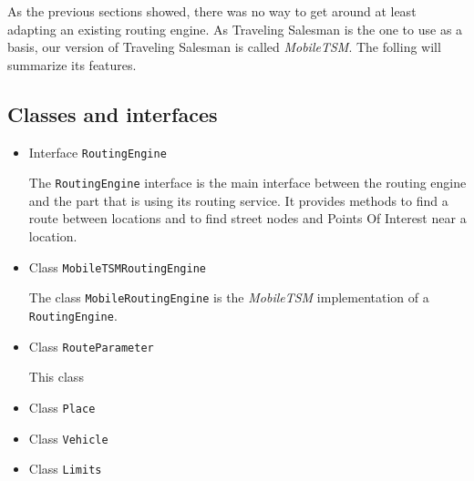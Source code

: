 As the previous sections showed, there was no way to get around at least adapting an existing routing engine. As Traveling Salesman is the one to use as a basis, our version of Traveling Salesman is called \emph{MobileTSM}. The folling will summarize its features.

\subsection{Classes and interfaces}

\begin{itemize}

	\item Interface \texttt{RoutingEngine}
	
		The \texttt{RoutingEngine} interface is the main interface between the routing engine and the part that is using its routing service. It provides methods to find a route between locations and to find street nodes and Points Of Interest near a location.
		
	\item Class \texttt{MobileTSMRoutingEngine}
	
		The class \texttt{MobileRoutingEngine} is the \emph{MobileTSM} implementation of a \texttt{RoutingEngine}.
	
	\item Class \texttt{RouteParameter}
	
		This class 
	
	\item Class \texttt{Place}
	
	
	\item Class \texttt{Vehicle}
	
	
	\item Class \texttt{Limits}

\end{itemize}
